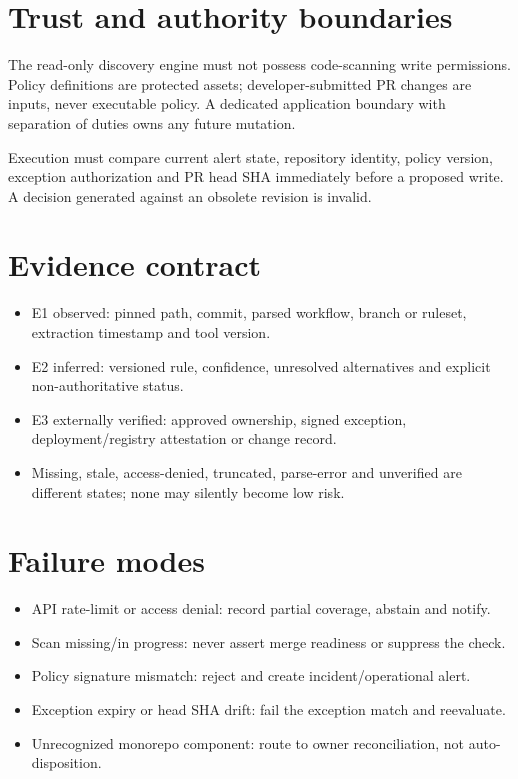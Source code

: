 \documentclass[11pt,letterpaper]{article}
\begin{document}
\section{Trust and authority boundaries}
The read-only discovery engine must not possess code-scanning write permissions. Policy definitions are protected assets; developer-submitted PR changes are inputs, never executable policy. A dedicated application boundary with separation of duties owns any future mutation.

Execution must compare current alert state, repository identity, policy version, exception authorization and PR head SHA immediately before a proposed write. A decision generated against an obsolete revision is invalid.


\section{Evidence contract}
\begin{itemize}
\item E1 observed: pinned path, commit, parsed workflow, branch or ruleset, extraction timestamp and tool version.
\item E2 inferred: versioned rule, confidence, unresolved alternatives and explicit non-authoritative status.
\item E3 externally verified: approved ownership, signed exception, deployment/registry attestation or change record.
\item Missing, stale, access-denied, truncated, parse-error and unverified are different states; none may silently become low risk.
\end{itemize}

\section{Failure modes}
\begin{itemize}
\item API rate-limit or access denial: record partial coverage, abstain and notify.
\item Scan missing/in progress: never assert merge readiness or suppress the check.
\item Policy signature mismatch: reject and create incident/operational alert.
\item Exception expiry or head SHA drift: fail the exception match and reevaluate.
\item Unrecognized monorepo component: route to owner reconciliation, not auto-disposition.
\end{itemize}
\end{document}
